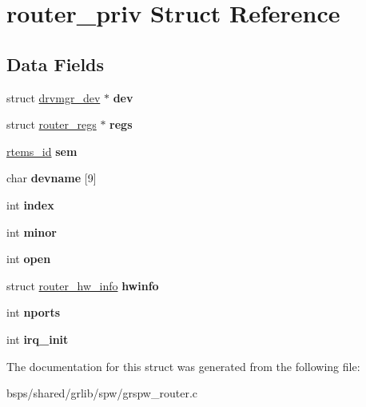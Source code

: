 \hypertarget{structrouter__priv}{}\section{router\+\_\+priv Struct Reference}
\label{structrouter__priv}
\subsection*{Data Fields}
\begin{DoxyCompactItemize}
\item 
\mbox{\label{structrouter__priv_a75b22d153a5a88ce720692ce9c59c82f}} 
struct \mbox{\hyperlink{structdrvmgr__dev}{drvmgr\+\_\+dev}} $\ast$ {\bfseries dev}
\item 
\mbox{\label{structrouter__priv_a7ae682bd189bb98525f2efa52ae2cea5}} 
struct \mbox{\hyperlink{structrouter__regs}{router\+\_\+regs}} $\ast$ {\bfseries regs}
\item 
\mbox{\label{structrouter__priv_a13f0a37645e9fbbed08e43f78268d2d1}} 
\mbox{\hyperlink{group__ClassicTasks_gab20892b814dced7dd4e5b9bf42becd57}{rtems\+\_\+id}} {\bfseries sem}
\item 
\mbox{\label{structrouter__priv_a174be3d7c10bac5a3c29441823f38974}} 
char {\bfseries devname} \mbox{[}9\mbox{]}
\item 
\mbox{\label{structrouter__priv_a9d1ebe758b5e883f364bdfb7e8dab9bd}} 
int {\bfseries index}
\item 
\mbox{\label{structrouter__priv_a5f6e31be614463a506c729e35c50ac8c}} 
int {\bfseries minor}
\item 
\mbox{\label{structrouter__priv_a2c592a2dc4b047879821dc23cf7900b6}} 
int {\bfseries open}
\item 
\mbox{\label{structrouter__priv_a58c7a41bc634bf360353168c0e10585a}} 
struct \mbox{\hyperlink{structrouter__hw__info}{router\+\_\+hw\+\_\+info}} {\bfseries hwinfo}
\item 
\mbox{\label{structrouter__priv_a7b8d70f0827a6b693cf014eabd092dc5}} 
int {\bfseries nports}
\item 
\mbox{\label{structrouter__priv_a9c5356fbf46b033c2bf5bc46d84dfb40}} 
int {\bfseries irq\+\_\+init}
\end{DoxyCompactItemize}


The documentation for this struct was generated from the following file\+:\begin{DoxyCompactItemize}
\item 
bsps/shared/grlib/spw/grspw\+\_\+router.\+c\end{DoxyCompactItemize}
